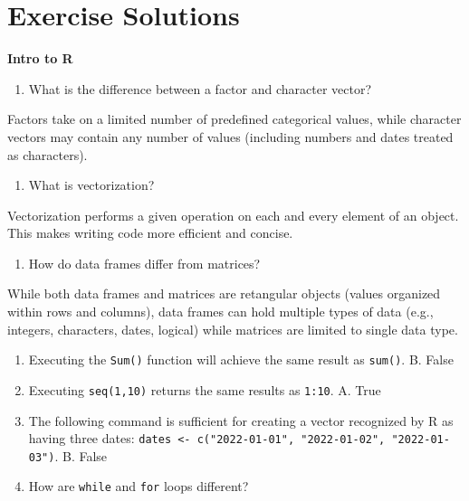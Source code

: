 \documentclass[]{book}
\providecommand{\tightlist}{%
  \setlength{\itemsep}{0pt}\setlength{\parskip}{0pt}}
\begin{document}
\hypertarget{exercise-solutions}{%
\section{Exercise Solutions}\label{exercise-solutions}}

\textbf{Intro to R}

\begin{enumerate}
\def\labelenumi{\arabic{enumi}.}
\tightlist
\item
  What is the difference between a factor and character vector?
\end{enumerate}

Factors take on a limited number of predefined categorical values, while character vectors may contain any number of values (including numbers and dates treated as characters).

\begin{enumerate}
\def\labelenumi{\arabic{enumi}.}
\setcounter{enumi}{1}
\tightlist
\item
  What is vectorization?
\end{enumerate}

Vectorization performs a given operation on each and every element of an object. This makes writing code more efficient and concise.

\begin{enumerate}
\def\labelenumi{\arabic{enumi}.}
\setcounter{enumi}{2}
\tightlist
\item
  How do data frames differ from matrices?
\end{enumerate}

While both data frames and matrices are retangular objects (values organized within rows and columns), data frames can hold multiple types of data (e.g., integers, characters, dates, logical) while matrices are limited to single data type.

\begin{enumerate}
\def\labelenumi{\arabic{enumi}.}
\setcounter{enumi}{3}
\item
  Executing the \texttt{Sum()} function will achieve the same result as \texttt{sum()}.
  B. False
\item
  Executing \texttt{seq(1,10)} returns the same results as \texttt{1:10}.
  A. True
\item
  The following command is sufficient for creating a vector recognized by R as having three dates: \texttt{dates\ \textless{}-\ c("2022-01-01",\ "2022-01-02",\ "2022-01-03")}.
  B. False
\item
  How are \texttt{while} and \texttt{for} loops different?
\end{enumerate}
\end{document}
